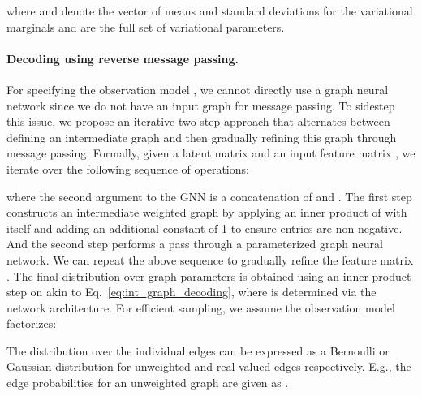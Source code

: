 \documentclass{article}
\begin{document}
where  and  denote the vector of means and standard deviations for the variational marginals  and  are the full set of variational parameters.

\paragraph{Decoding using reverse message passing.} For specifying the observation model , we cannot directly use a graph neural network since we do not have an input graph for message passing. To sidestep this issue, we propose an iterative two-step approach that alternates between defining an intermediate graph and then gradually refining this graph through message passing.
Formally, given a latent matrix  and an input feature matrix , we iterate over the following sequence of operations:

where the second argument to the GNN is a concatenation of   and . The first step constructs an intermediate weighted graph  by applying an inner product of  with itself and adding an additional constant of 1 to ensure entries are non-negative. 
And the second step performs a pass through a parameterized graph neural network. We can repeat the above sequence to gradually refine the feature matrix . The final distribution over graph parameters is obtained using an inner product step on  akin to Eq.~\eqref{eq:int_graph_decoding}, where  is determined via the network architecture.
For efficient sampling, we assume the observation model factorizes:

The distribution over the individual edges can be expressed as a Bernoulli or Gaussian distribution for unweighted and real-valued edges respectively. E.g., the edge probabilities for an unweighted graph are given as .
\end{document}
